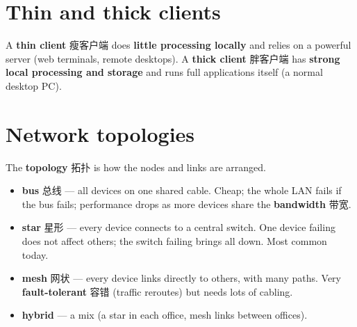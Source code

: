 \documentclass[11pt]{article}
\begin{document}
\section*{Thin and thick clients}

A \textbf{thin client} 瘦客户端 does \textbf{little processing locally} and relies on a powerful server (web terminals, remote desktops). A \textbf{thick client} 胖客户端 has \textbf{strong local processing and storage} and runs full applications itself (a normal desktop PC).

\begin{center}
\end{center}

\section*{Network topologies}

The \textbf{topology} 拓扑 is how the nodes and links are arranged.

\begin{itemize}
\item \textbf{bus} 总线 — all devices on one shared cable. Cheap; the whole LAN fails if the bus fails; performance drops as more devices share the \textbf{bandwidth} 带宽.

\item \textbf{star} 星形 — every device connects to a central switch. One device failing does not affect others; the switch failing brings all down. Most common today.

\item \textbf{mesh} 网状 — every device links directly to others, with many paths. Very \textbf{fault-tolerant} 容错 (traffic reroutes) but needs lots of cabling.

\item \textbf{hybrid} — a mix (a star in each office, mesh links between offices).

\end{itemize}
\end{document}
